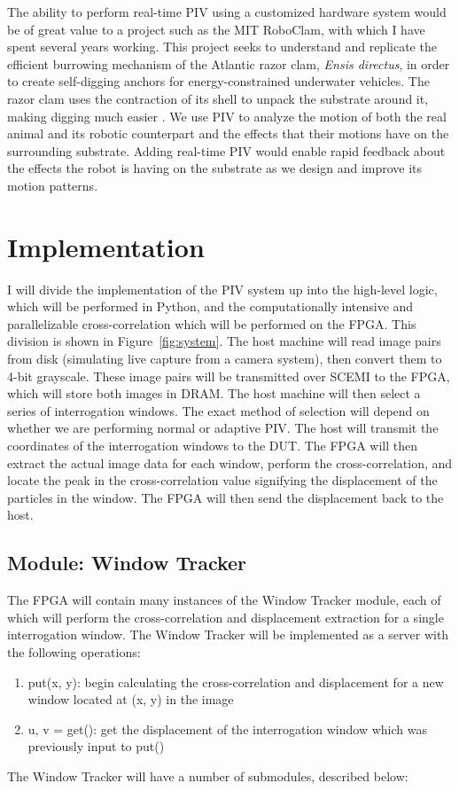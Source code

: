 \documentclass{article}
\begin{document}
	The ability to perform real-time PIV using a customized hardware system would be of great value to a project such as the MIT RoboClam, with which I have spent several years working. This project seeks to understand and replicate the efficient burrowing mechanism of the Atlantic razor clam, \emph{Ensis directus}, in order to create self-digging anchors for energy-constrained underwater vehicles. The razor clam uses the contraction of its shell to unpack the substrate around it, making digging much easier \citep{Winter:2012hj}. We use PIV to analyze the motion of both the real animal and its robotic counterpart and the effects that their motions have on the surrounding substrate. Adding real-time PIV would enable rapid feedback about the effects the robot is having on the substrate as we design and improve its motion patterns. 

	\section{Implementation}
	I will divide the implementation of the PIV system up into the high-level logic, which will be performed in Python, and the computationally intensive and parallelizable cross-correlation which will be performed on the FPGA. This division is shown in Figure~\ref{fig:system}. The host machine will read image pairs from disk (simulating live capture from a camera system), then convert them to 4-bit grayscale. These image pairs will be transmitted over SCEMI to the FPGA, which will store both images in DRAM. The host machine will then select a series of interrogation windows. The exact method of selection will depend on whether we are performing normal or adaptive PIV. The host will transmit the coordinates of the interrogation windows to the DUT. The FPGA will then extract the actual image data for each window, perform the cross-correlation, and locate the peak in the cross-correlation value signifying the displacement of the particles in the window. The FPGA will then send the displacement back to the host. 

	\subsection{Module: Window Tracker}
	The FPGA will contain many instances of the Window Tracker module, each of which will perform the cross-correlation and displacement extraction for a single interrogation window. The Window Tracker will be implemented as a server with the following operations: 
	\begin{enumerate}
		\item put(x, y): begin calculating the cross-correlation and displacement for a new window located at (x, y) in the image
		\item u, v = get(): get the displacement of the interrogation window which was previously input to put()
	\end{enumerate}
	The Window Tracker will have a number of submodules, described below:
\end{document}
